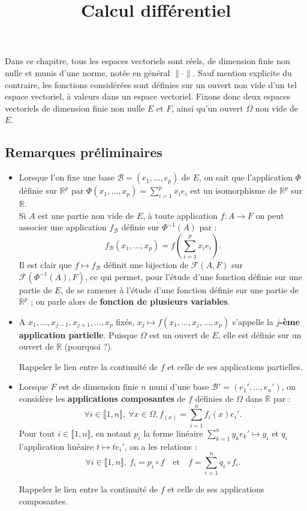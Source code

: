 \documentclass[french]{article}
\title{Calcul différentiel}
\date{}
\newcommand{\R}{\mathbb{R}}
\newcommand{\inv}{^{-1}}
\theoremstyle{plain}
\theoremstyle{definition}
\theoremstyle{remark}
\begin{document}
\tableofcontents

\newpage
\maketitle

Dans ce chapitre, tous les espaces vectoriels sont réels, de dimension finie non nulle et munis d'une norme, notée en général $\lVert\cdot\rVert$. Sauf mention explicite du contraire, les fonctions considérées sont définies sur un ouvert non vide d'un tel espace vectoriel, à valeurs dans un espace vectoriel. Fixons donc deux espaces vectoriels de dimension finie non nulle $E$ et $F$, ainsi qu'un ouvert $\Omega$ non vide de $E$.

\subsection*{Remarques préliminaires}

\begin{itemize}
	\item Lorsque l'on fixe une base $\mathcal{B}=(e_1,\ldots,e_p)$ de $E$, on sait que l'application $\Phi$ définie sur $\R^p$ par $\Phi(x_1,\ldots,x_p)=\displaystyle\sum_{i=1}^{p}x_ie_i$ est un isomorphisme de $\R^p$ sur $\R$.\\
	Si $A$ est une partie non vide de $E$, à toute application $f:A\to F$ on peut associer une application $f_{\mathcal{B}}$ définie sur $\Phi\inv(A)$ par : 
	$$f_{\mathcal{B}}(x_1,\ldots,x_p)=f\left(\sum_{i=1}^{p}x_ie_i\right).$$
	Il est clair que $f\mapsto f_{\mathcal{B}}$ définit une bijection de $\mathcal{F}(A,F)$ sur $\mathcal{F}(\Phi\inv(A),F)$, ce qui permet, pour l'étude d'une fonction définie sur une partie de $E$, de se ramener à l'étude d'une fonction définie sur une partie de $\R^p$ ; on parle alors de \textbf{fonction de plusieurs variables}.
	\item A $x_1,\ldots,x_{j-1},x_{j+1},\ldots,x_p$ fixés, $x_j\mapsto f(x_1,\ldots,x_j,\ldots,x_p)$ s'appelle la \textbf{$j$-ème application partielle}. Puisque $\Omega$ est un ouvert de $E$, elle est définie sur un ouvert de $\R$ (pourquoi ?).
	\begin{exo}
		Rappeler le lien entre la continuité de $f$ et celle de ses applications partielles.
	\end{exo}
	\item Lorsque $F$ est de dimension finie $n$ muni d'une base $\mathcal{B}'=(e_1',\ldots,e_n')$, on considère les \textbf{applications composantes} de $f$ définies de $\Omega$ dans $\R$ par :
	$$\forall i\in\llbracket1,n\rrbracket,\ \forall x\in\Omega, f_(x)=\sum_{i=1}^{n}f_i(x)e_i'.$$
	Pour tout $i\in\llbracket1,n\rrbracket$, en notant $p_i$ la forme linéaire $\displaystyle\sum_{k=1}^{n}y_ke_k'\mapsto y_i$ et $q_i$ l'application linéaire $t\mapsto te_i'$, on a les relations :
	$$\forall i\in\llbracket1,n\rrbracket,\ f_i=p_i\circ f\quad\text{et}\quad f=\sum_{i=1}^{n}q_i\circ f_i.$$
	\begin{exo}
		Rappeler le lien entre la continuité de $f$ et celle de ses applications composantes.
	\end{exo}
\end{itemize}
\end{document}
